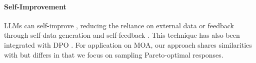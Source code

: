 \paragraph{Self-Improvement}
LLMs can self-improve \cite{DBLP:journals/corr/abs-2210-11610, DBLP:conf/acl/WangKMLSKH23}, reducing the reliance on external data or feedback through self-data generation and self-feedback \cite{DBLP:journals/corr/abs-2210-11610, DBLP:conf/acl/WangKMLSKH23, DBLP:conf/iclr/PangWLC0Z024, DBLP:conf/icml/YuanPCLSXW24}. This technique has also been integrated with DPO \cite{DBLP:conf/nips/PangYHCSW24, xu2023some, DBLP:conf/icml/0015DYW0J0024}.
For application on MOA, our approach shares similarities with \citet{DBLP:conf/acl/WangLXYDQZZ24} but differs in that we focus on sampling Pareto-optimal responses.